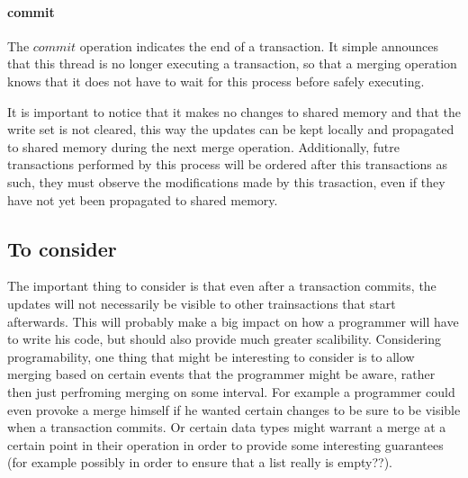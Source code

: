\documentclass[11pt,letterpaper]{article}
\begin{document}
\paragraph{commit}
The $\mathit{commit}$ operation indicates the end of a transaction.
It simple announces that this thread is no longer executing a transaction,
so that a merging operation knows that it does not have to wait for this process
before safely executing.

It is important to notice that it makes no changes to shared memory and that the write set is not cleared,
this way the updates can be kept locally and propagated to shared memory during the next merge operation.
Additionally, futre transactions performed by this process will be ordered after this
transactions as such, they must observe the modifications made by this trasaction, even if they
have not yet been propagated to shared memory.


\subsection{To consider}
The important thing to consider is that even after a transaction commits, the updates will not
necessarily be visible to other trainsactions that start afterwards.
This will probably make a big impact on how a programmer will have to write his code, but should
also provide much greater scalibility.
Considering programability, one thing that might be interesting to consider is to allow merging
based on certain events that the programmer might be aware, rather then just perfroming merging
on some interval.
For example a programmer could even provoke a merge himself if he wanted certain changes to be sure
to be visible when a transaction commits.
Or certain data types might warrant a merge at a certain point in their operation in order
to provide some interesting guarantees (for example possibly in order to ensure 
that a list really is empty??).
\end{document}
